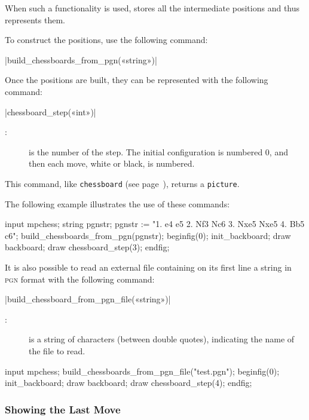 \documentclass[english]{ltxdoc}
\begin{document}
When such a functionality is used, \mpchess stores all the
intermediate positions and thus represents them.

To construct the positions, use the following command:

\commande|build_chessboards_from_pgn(«string»)|\smallskip


Once the positions are built, they can be represented with the following command:

\commande|chessboard_step(«int»)|\smallskip
\begin{description}
\item[:] is the number of the step. The initial configuration is numbered 0, and then each move, white or black, is numbered.
\end{description}

This command, like \lstinline+chessboard+ (see page~\pageref{com:chessboard}),
returns a \lstinline+picture+. 

The following example illustrates the use of these commands:

\begin{ExempleMP}
input mpchess;
string pgnstr;
pgnstr := "1. e4 e5 2. Nf3 Nc6 3. Nxe5 Nxe5 4. Bb5 c6";
build_chessboards_from_pgn(pgnstr);
beginfig(0);
init_backboard;
draw backboard;
draw chessboard_step(3); %
endfig;
\end{ExempleMP}


It is also possible to read an external file containing on its first line a
string in  \textsc{pgn} format with the following command:

\commande|build_chessboard_from_pgn_file(«string»)|\smallskip

\begin{description}
  \item[:] is a string of characters (between double quotes),
  indicating the name of the file to read.  
\end{description}

\begin{ExempleMP}
input mpchess;
build_chessboards_from_pgn_file("test.pgn");
beginfig(0);
init_backboard;
draw backboard;
draw chessboard_step(4); %
endfig;
\end{ExempleMP}

\subsubsection{Showing the Last Move}
\end{document}
